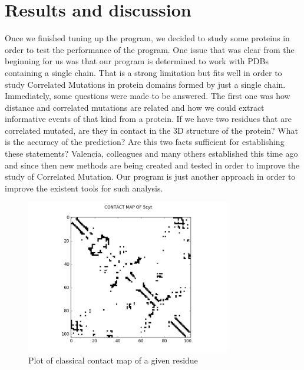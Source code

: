 \documentclass[12pt]{article}
\begin{document}
\section{Results and discussion}
Once we finished tuning up the program, we decided to study some proteins in order to test the performance of the program. One issue that was clear from the beginning for us was that our program is determined to work with PDBs containing a single chain. That is a strong limitation but fits well in order to study Correlated Mutations in protein domains formed by just a single chain. Immediately, some questions were made to be answered. The first one was how distance and correlated mutations are related and how we could extract informative events of that kind from a protein. If we have two residues that are correlated mutated, are they in contact in the 3D structure of the protein? What is the accuracy of the prediction? Are this two facts sufficient for establishing these statements? Valencia, colleagues and many others established this time ago and since then new methods are being created and tested in order to improve the study of Correlated Mutation. Our program is just another approach in order to improve the existent tools for such analysis. \\
\begin{figure}[h]
\centering
\includegraphics[width=0.8\textwidth]{figure4_contactmap_5cyt_c_CB.png}
\caption{Plot of classical contact map of a given residue}
\label{fig:ContactMap}
\end{figure}
\end{document}
